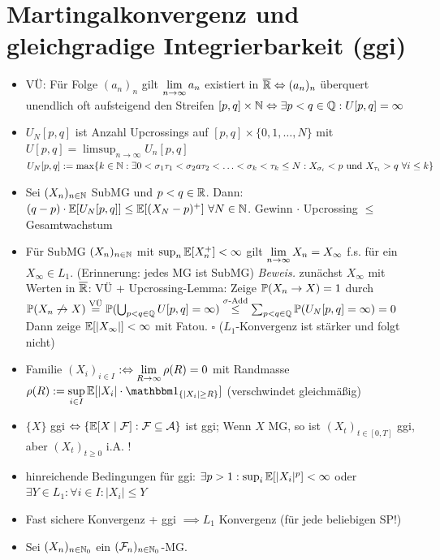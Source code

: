 \documentclass[12pt]{scrartcl}
\begin{document}
	\section{Martingalkonvergenz und gleichgradige Integrierbarkeit (ggi)}
	\begin{itemize}
		\item VÜ: Für Folge $(a_n)_n$ gilt $\limn a_n$ existiert  in $\overline{\R}\gdw(a_n)_n$ überquert unendlich oft aufsteigend den Streifen $[p,q]\times\N\gdw\exists p<q\in\Q:U[p,q]=\infty$
		\item $U_N[p,q]$ ist Anzahl Upcrossings auf $[p,q]\times\lbrace0,1,\ldots,N\rbrace$ mit $U[p,q]=\limsup_{n\to\infty} U_n[p,q]$\\
		$U_N[p,q]:=\max\lbrace k\in\N:\exists 0<\sigma_1\tau_1<\sigma_2a\tau_2<\ldots<\sigma_k<\tau_k\leq N:X_{\sigma_i}<p\und X_{\tau_i}>q~\forall i\leq k\rbrace$
		\item {} Sei $(X_n)_{n\in\N}$ SubMG und $p<q\in\R$. Dann:
		$(q-p)\cdot\E[U_N[p,q]]\leq\E[(X_N-p)^+]~\forall N\in\N$. Gewinn $\cdot$ Upcrossing $\leq$ Gesamtwachstum
		\item {} Für SubMG $(X_n)_{n\in\N}$ mit $\sup_n\E[X_n^+]<\infty$ gilt $\limn X_n=X_\infty$ f.s. für ein $X_\infty\in L_1$. (Erinnerung: jedes MG ist SubMG)
		\textit{Beweis.} zunächst $X_\infty$ mit Werten in $\overline{\R}$: VÜ + Upcrossing-Lemma:
		Zeige $\P(X_n\to X)=1$ durch $\P(X_n\not\to X)\stackeq{\text{VÜ}}\P(\bigcup_{p<q\in\Q}U[p,q]=\infty)\overset{\sigma\text{-Add}}{\leq}\sum_{p<q\in\Q}\P(U_N[p,q]=\infty)=0$
		 Dann zeige $\E[|X_\infty|]<\infty$ mit Fatou. $\square$ ($L_1$-Konvergenz ist stärker und folgt nicht)
		\item Familie $(X_i)_{i\in I}$  $:\gdw\lim\limits_{R\to\infty}\rho(R)=0$ mit Randmasse $\rho(R):=\sup\limits_{i\in I}\E[|X_i|\cdot\indi_{\lbrace|X_i|\geq R\rbrace}]$ (verschwindet gleichmäßig)
		\item $\lbrace X\rbrace$ ggi $\gdw\lbrace\E[X\mid\F]:\F\subseteq\A\rbrace$ ist ggi; Wenn $X$ MG, so ist $(X_t)_{t\in[0,T]}$ ggi, aber $(X_t)_{t\geq0}$ i.A. !
		\item hinreichende Bedingungen für ggi: $\exists p>1:\sup_{i}\E[|X_i|^p]<\infty$ oder $\exists Y\in L_1:\forall i\in I:|X_i|\leq Y$
		\item Fast sichere Konvergenz + ggi $\implies L_1$ Konvergenz (für jede beliebigen SP!)
		\item {} Sei $(X_n)_{n\in\N_0}$ ein $(\F_n)_{n\in\N_0}$-MG. 

\end{itemize}
\end{document}
